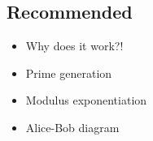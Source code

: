 
\subsection{Recommended}
\begin{itemize}
\item Why does it work?!
\item Prime generation
\item Modulus exponentiation
\item Alice-Bob diagram
\end{itemize}
